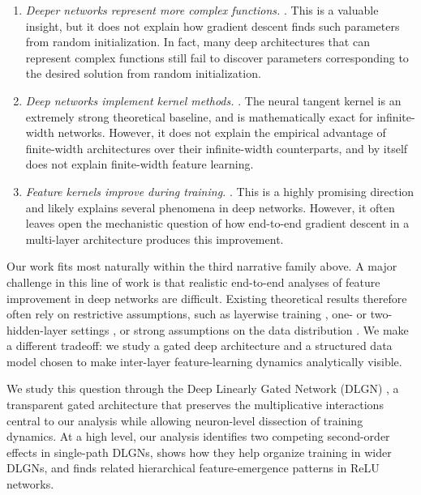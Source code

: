 \documentclass{article}
\theoremstyle{plain}
\theoremstyle{definition}
\theoremstyle{remark}
\newcommand{\1}{{\mathbf 1}}
\newcommand{\0}{{\mathbf 0}}
\renewcommand{\>}{{\rightarrow}}
\begin{document}
\begin{enumerate}
\item \textit{Deeper networks represent more complex functions.} \cite{Telgarsky+16, Montufar+14}. This is a valuable insight, but it does not explain how gradient descent finds such parameters from random initialization. In fact, many deep architectures that can represent complex functions still fail to discover parameters corresponding to the desired solution from random initialization.
\item \textit{Deep networks implement kernel methods.} \cite{Jacot+18, Arora+19}. The neural tangent kernel is an extremely strong theoretical baseline, and is mathematically exact for infinite-width networks. However, it does not explain the empirical advantage of finite-width architectures over their infinite-width counterparts, and by itself does not explain finite-width feature learning.
\item \textit{Feature kernels improve during training.} \cite{Frei+23, Nichani+23, Damian+22}. This is a highly promising direction and likely explains several phenomena in deep networks. However, it often leaves open the mechanistic question of how end-to-end gradient descent in a multi-layer architecture produces this improvement.
\end{enumerate}

Our work fits most naturally within the third narrative family above. A major challenge in this line of work is that realistic end-to-end analyses of feature improvement in deep networks are difficult. Existing theoretical results therefore often rely on restrictive assumptions, such as layerwise training \cite{Nichani+23, Dandi+24}, one- or two-hidden-layer settings \cite{Nichani+23, Dandi+24, Abbe+21, Damian+22}, or strong assumptions on the data distribution \cite{Abbe+21, Dandi+24}. We make a different tradeoff: we study a gated deep architecture and a structured data model chosen to make inter-layer feature-learning dynamics analytically visible.

We study this question through the Deep Linearly Gated Network (DLGN) \cite{Banerjee+25}, a transparent gated architecture that preserves the multiplicative interactions central to our analysis while allowing neuron-level dissection of training dynamics. At a high level, our analysis identifies two competing second-order effects in single-path DLGNs, shows how they help organize training in wider DLGNs, and finds related hierarchical feature-emergence patterns in ReLU networks.
\end{document}
